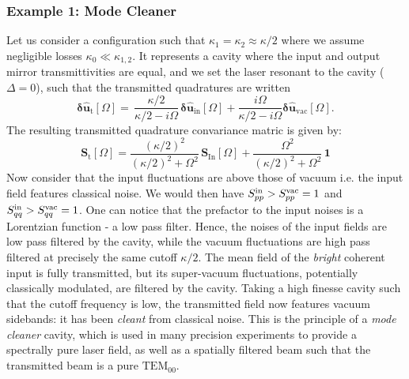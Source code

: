 \subsubsection{Example 1: Mode Cleaner }
Let us consider a configuration such that $\kappa_1 = \kappa_2 \approx \kappa/2$ where we assume negligible losses $\kappa_0 \ll \kappa_{1,2}$. It represents a cavity where the input and output mirror transmittivities are equal, and we set the laser resonant to the cavity ($\Delta=0$), such that the transmitted quadratures are written
\begin{equation}
  \mathbf{\delta \hat{u}_{\mathrm{t}}}[\Omega]  = \, \dfrac{ \kappa/2}{\kappa/2-i\Omega}  \, \mathbf{\delta \hat{u}_{\mathrm{in}}}[\Omega]   +  \dfrac{i\Omega}{\kappa/2-i\Omega}   \mathbf{\delta \hat{u}_{\mathrm{vac}}}[\Omega] .
\end{equation}
The resulting transmitted quadrature convariance matric is given by: 
\begin{equation}
  \mathbf{S}_{\mathrm{t}}[\Omega] =\frac{(\kappa/2)^2}{(\kappa/2)^2+\Omega^2} \, \mathbf{S}_{\mathrm{In}}[\Omega] +\frac{\Omega^2}{(\kappa/2)^2+\Omega^2}  \,  \mathbf{1}
\end{equation}
Now consider that the input fluctuations are above those of vacuum i.e. the input field features classical noise. We would then have $S_{pp}^{\rm in}> S_{pp}^{\rm vac}=1$ and $S_{qq}^{\rm in}> S_{qq}^{\rm vac}=1$. One can notice that the prefactor to the input noises is a Lorentzian function - a low pass filter. Hence, the noises of the input fields are low pass filtered by the cavity, while the vacuum fluctuations are high pass filtered at precisely the same cutoff $\kappa/2$. The mean field of the \textit{bright} coherent input is fully transmitted, but its super-vacuum fluctuations, potentially classically modulated, are filtered by the cavity. Taking a high finesse cavity such that the cutoff frequency is low, the transmitted field now features vacuum sidebands: it has been \textit{cleant} from classical noise. This is the principle of a \textit{mode cleaner} cavity, which is used in many precision experiments to provide a spectrally pure laser field, as well as a spatially filtered beam such that the transmitted beam is a pure $\mathrm{TEM}_{00}$.\\


